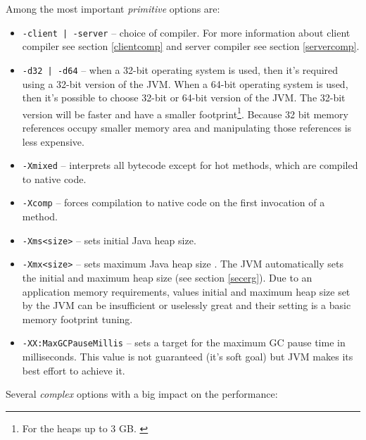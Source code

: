 \documentclass[
  digital, %
  oneside,
  notable, %
  nolof,     %
  nolot     %
]{fithesis3}
\begin{document}
Among the most important \textit{primitive} options are:
\begin{itemize}
	\item \texttt{-client | -server} -- choice of compiler. For more information about client compiler see section \ref{clientcomp} and server compiler see section \ref{servercomp}.
	\item \texttt{-d32 | -d64} -- when a 32-bit operating system is used, then it's required using a 32-bit version of the JVM. When a 64-bit operating system is used, then it's possible to choose 32-bit or 64-bit version of the JVM. The 32-bit version will be faster and have a smaller footprint\footnote{For the heaps up to 3 GB. \cite{scott}}. Because 32 bit memory references occupy smaller memory area and manipulating those references is less expensive. \cite{scott}
	\item \texttt{-Xmixed} -- interprets all bytecode except for hot methods, which are compiled to native code. \cite{java}
	\item \texttt{-Xcomp} -- forces compilation to native code on the first invocation of a method. \cite{java}
	\item \texttt{-Xms<size>} -- sets initial Java heap size. \cite{java}
	\item \texttt{-Xmx<size>} -- sets maximum Java heap size \cite{java}. The JVM automatically sets the initial and maximum heap size (see section \ref{secerg}). Due to an application memory requirements, values initial and maximum heap size set by the JVM can be insufficient or uselessly great and their setting is a basic memory footprint tuning.
	\item \texttt{-XX:MaxGCPauseMillis} -- sets a target for the maximum GC pause time in milliseconds. This value is not guaranteed (it's soft goal) but JVM makes its best effort to achieve it.
\end{itemize}
Several \textit{complex} options with a big impact on the performance:
\end{document}
